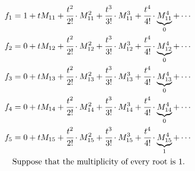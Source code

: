 \documentclass[12pt,a4paper]{article}
\begin{document}
\begin{align}
f_1 &= 1 + tM_{11} + \cfrac{t^2}{2!}\cdot M^2_{11} + \cfrac{t^3}{3!}\cdot M^3_{11} + \cfrac{t^4}{4!}\cdot \underbrace{M^4_{11}}_{0} + \cdots \\
f_2 &= 0 + tM_{12} + \cfrac{t^2}{2!}\cdot M^2_{12} + \cfrac{t^3}{3!}\cdot M^3_{12} + \cfrac{t^4}{4!}\cdot \underbrace{M^4_{12}}_{0} + \cdots \\
f_3 &= 0 + tM_{13} + \cfrac{t^2}{2!}\cdot M^2_{13} + \cfrac{t^3}{3!}\cdot M^3_{13} + \cfrac{t^4}{4!}\cdot \underbrace{M^4_{13}}_{0} + \cdots \\
f_4 &= 0 + tM_{14} + \cfrac{t^2}{2!}\cdot M^2_{14} + \cfrac{t^3}{3!}\cdot M^3_{14} + \cfrac{t^4}{4!}\cdot \underbrace{M^4_{14}}_{0} + \cdots \\
f_5 &= 0 + tM_{15} + \cfrac{t^2}{2!}\cdot M^2_{15} + \cfrac{t^3}{3!}\cdot M^3_{15} + \cfrac{t^4}{4!}\cdot \underbrace{M^4_{15}}_{1} + \cdots \\
&\text{Suppose that the multiplicity of every root is }1. \nonumber
\end{align}
\end{document}
